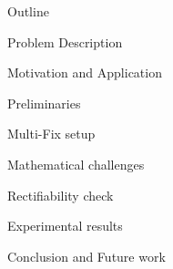 \begin{frame}{\large Outline}
\bi
	\item Problem Description
	\item Motivation and Application
	\item Preliminaries
	\item Multi-Fix setup
	\bi
		\item Mathematical challenges
	\ei
	\item Rectifiability check
	\item Experimental results
	\item Conclusion and Future work
\ei
\end{frame}

